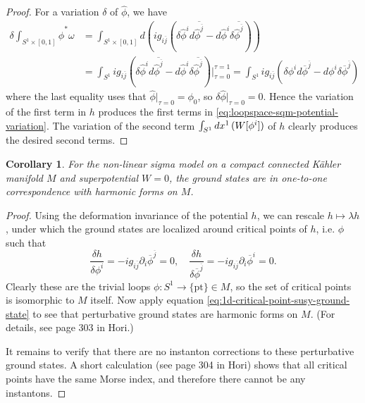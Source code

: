 \documentclass{report}
\theoremstyle{plain}
\newtheorem{corollary}[theorem]{Corollary}
\theoremstyle{definition}
\theoremstyle{remark}
\newcommand{\di}{\partial}
\let\Re\relax
\DeclareMathOperator{\Re}{Re}
\newcommand{\pt}{\mathrm{pt}}
\newcommand{\cnj}{\overline}
\begin{document}
\begin{proof}
  For a variation $\delta$ of $\hat\phi$, we have
  \begin{align*}
    \delta \int_{S^1 \times [0,1]} \hat\phi^*\omega
    &= \int_{S^1 \times [0,1]} d\left(ig_{i\cnj j} \left(\delta \hat\phi^i d\cnj{\hat{\phi}^{\cnj j}} - d \hat\phi^i \delta\cnj{\hat{\phi}^{\cnj j}}\right)\right) \\
    &= \int_{S^1} ig_{i\cnj j} \left(\delta \hat\phi^i d\cnj{\hat{\phi}^{\cnj j}} - d \hat\phi^i \delta\cnj{\hat{\phi}^{\cnj j}}\right)\big|_{\tau=0}^{\tau=1} = \int_{S^1} ig_{i\cnj j} \left(\delta \phi^i d\cnj\phi^{\cnj j} - d\phi^i \delta\cnj\phi^{\cnj j}\right)
  \end{align*}
  where the last equality uses that $\hat\phi|_{\tau=0} = \phi_0$, so
  $\delta\hat\phi|_{\tau=0} = 0$. Hence the variation of the first
  term in $h$ produces the first terms in
  \eqref{eq:loopspace-sqm-potential-variation}. The variation of the
  second term $\int_{S^1} dx^1 \, \Re(W[\phi^i])$ of $h$ clearly
  produces the desired second terms.
\end{proof}

\begin{corollary}
  For the non-linear sigma model on a compact connected K\"ahler
  manifold $M$ and superpotential $W=0$, the ground states are in
  one-to-one correspondence with harmonic forms on $M$.
\end{corollary}

\begin{proof}
  Using the deformation invariance of the potential $h$, we can
  rescale $h \mapsto \lambda h$, under which the ground states are
  localized around critical points of $h$, i.e. $\phi$ such that
  \[ \frac{\delta h}{\delta \phi^i} = -ig_{i\cnj j} \di_i \cnj\phi^{\cnj j} = 0, \quad \frac{\delta h}{\delta \cnj\phi^{\cnj j}} = -ig_{i\cnj j} \di_i \cnj\phi^i = 0. \]
  Clearly these are the trivial loops $\phi\colon S^1 \to \{\pt\} \in
  M$, so the set of critical points is isomorphic to $M$ itself. Now
  apply equation \eqref{eq:1d-critical-point-susy-ground-state} to see
  that perturbative ground states are harmonic forms on $M$. (For
  details, see page 303 in Hori.)

  It remains to verify that there are no instanton corrections to
  these perturbative ground states. A short calculation (see page 304
  in Hori) shows that all critical points have the same Morse index,
  and therefore there cannot be any instantons.
\end{proof}
\end{document}
